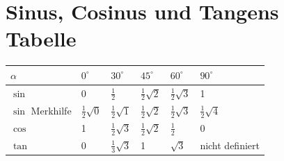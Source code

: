 \documentclass[a4paper,10pt]{report}
\begin{document}
 \section{Sinus, Cosinus und Tangens Tabelle}
 \begin{tabularx}{\textwidth}{X|X|X|X|X|X}
 $\alpha$&$0^\circ$&$30^\circ$&$45^\circ$&$60^\circ$&$90^\circ$\\\hline
 $\sin$&0&$\frac{1}{2}$&$\frac{1}{2}\sqrt{2}$&$\frac{1}{2}\sqrt{3}$&1\\ \hline
 $\sin$ Merkhilfe&$ \frac{1}{2}\sqrt{0}$&$\frac{1}{2}\sqrt{1}$&$\frac{1}{2}\sqrt{2}$&$\frac{1}{2}\sqrt{3}$&$\frac{1}{2}\sqrt{4}$\\ \hline
 $\cos$&1&$\frac{1}{2}\sqrt{3}$&$\frac{1}{2}\sqrt{2}$&$\frac{1}{2}$&0\\ \hline
 $\tan$&0&$\frac{1}{3}\sqrt{3}$&1&$\sqrt{3}$& nicht definiert
 \end{tabularx}

\end{document}
